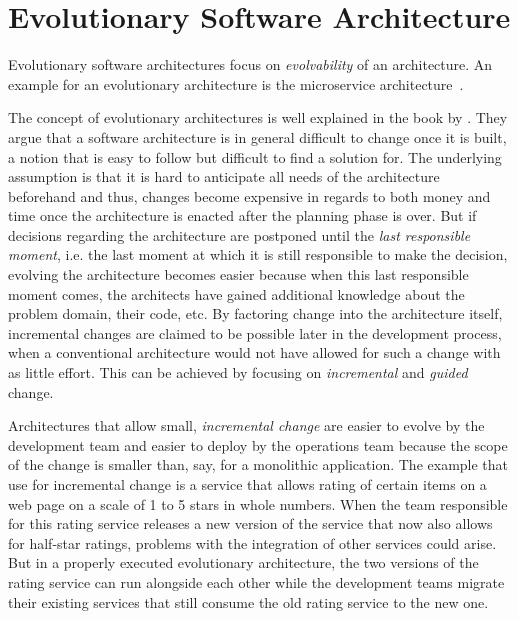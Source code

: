 \section{Evolutionary Software Architecture}
\label{sec:fundamentals:evolutionary}

Evolutionary software architectures focus on \emph{evolvability} of an architecture.
An example for an evolutionary architecture is the microservice architecture~\cite{WEB:EvolArch:2016}.

The concept of evolutionary architectures is well explained in the book by \citet{ford2017building}.
They argue that a software architecture is in general difficult to change once it is built, a notion that is easy to follow but difficult to find a solution for.
The underlying assumption is that it is hard to anticipate all needs of the architecture beforehand and thus, changes become expensive in regards to both money and time once the architecture is enacted after the planning phase is over.
But if decisions regarding the architecture are postponed until the \emph{last responsible moment}, i.e. the last moment at which it is still responsible to make the decision, evolving the architecture becomes easier because when this last responsible moment comes, the architects have gained additional knowledge about the problem domain, their code, etc.
By factoring change into the architecture itself, incremental changes are claimed to be possible later in the development process, when a conventional architecture would not have allowed for such a change with as little effort.
This can be achieved by focusing on \emph{incremental} and \emph{guided} change.

Architectures that allow small, \emph{incremental change} are easier to evolve by the development team and easier to deploy by the operations team because the scope of the change is smaller than, say, for a monolithic application.
The example that \citeauthor{ford2017building} use for incremental change is a service that allows rating of certain items on a web page on a scale of 1 to 5 stars in whole numbers.
When the team responsible for this rating service releases a new version of the service that now also allows for half-star ratings, problems with the integration of other services could arise.
But in a properly executed evolutionary architecture, the two versions of the rating service can run alongside each other while the development teams migrate their existing services that still consume the old rating service to the new one.

